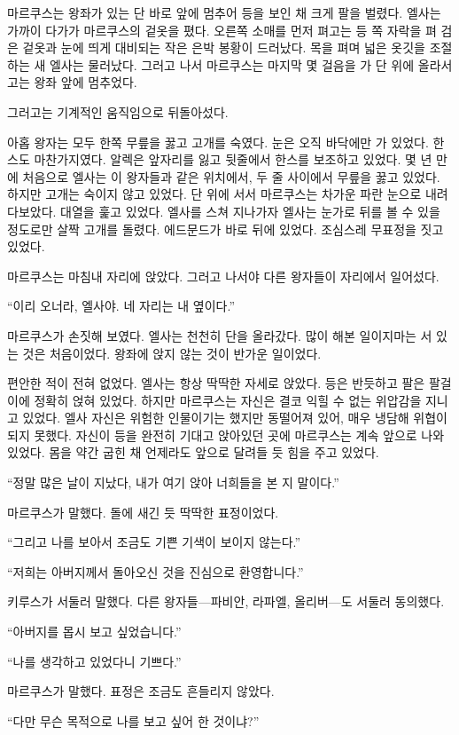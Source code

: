 마르쿠스는 왕좌가 있는 단 바로 앞에 멈추어 등을 보인 채 크게 팔을 벌렸다. 엘사는 가까이 다가가 마르쿠스의 겉옷을 폈다. 오른쪽 소매를 먼저 펴고는 등 쪽 자락을 펴 검은 겉옷과 눈에 띄게 대비되는 작은 은박 봉황이 드러났다. 목을 펴며 넓은 옷깃을 조절하는 새 엘사는 물러났다. 그러고 나서 마르쿠스는 마지막 몇 걸음을 가 단 위에 올라서고는 왕좌 앞에 멈추었다.

그러고는 기계적인 움직임으로 뒤돌아섰다.

아홉 왕자는 모두 한쪽 무릎을 꿇고 고개를 숙였다. 눈은 오직 바닥에만 가 있었다. 한스도 마찬가지였다. 알렉은 앞자리를 잃고 뒷줄에서 한스를 보조하고 있었다. 몇 년 만에 처음으로 엘사는 이 왕자들과 같은 위치에서, 두 줄 사이에서 무릎을 꿇고 있었다. 하지만 고개는 숙이지 않고 있었다. 단 위에 서서 마르쿠스는 차가운 파란 눈으로 내려다보았다. 대열을 훑고 있었다. 엘사를 스쳐 지나가자 엘사는 눈가로 뒤를 볼 수 있을 정도로만 살짝 고개를 돌렸다. 에드문드가 바로 뒤에 있었다. 조심스레 무표정을 짓고 있었다.

마르쿠스는 마침내 자리에 앉았다. 그러고 나서야 다른 왕자들이 자리에서 일어섰다.

``이리 오너라, 엘사야. 네 자리는 내 옆이다.''

마르쿠스가 손짓해 보였다. 엘사는 천천히 단을 올라갔다. 많이 해본 일이지마는 서 있는 것은 처음이었다. 왕좌에 앉지 않는 것이 반가운 일이었다.

편안한 적이 전혀 없었다. 엘사는 항상 딱딱한 자세로 앉았다. 등은 반듯하고 팔은 팔걸이에 정확히 얹혀 있었다. 하지만 마르쿠스는 자신은 결코 익힐 수 없는 위압감을 지니고 있었다. 엘사 자신은 위험한 인물이기는 했지만 동떨어져 있어, 매우 냉담해 위협이 되지 못했다. 자신이 등을 완전히 기대고 앉아있던 곳에 마르쿠스는 계속 앞으로 나와 있었다. 몸을 약간 굽힌 채 언제라도 앞으로 달려들 듯 힘을 주고 있었다.

``정말 많은 날이 지났다, 내가 여기 앉아 너희들을 본 지 말이다.''

마르쿠스가 말했다. 돌에 새긴 듯 딱딱한 표정이었다.

``그리고 나를 보아서 조금도 기쁜 기색이 보이지 않는다.''

``저희는 아버지께서 돌아오신 것을 진심으로 환영합니다.''

키루스가 서둘러 말했다. 다른 왕자들—파비안, 라파엘, 올리버—도 서둘러 동의했다.

``아버지를 몹시 보고 싶었습니다.''

``나를 생각하고 있었다니 기쁘다.''

마르쿠스가 말했다. 표정은 조금도 흔들리지 않았다.

``다만 무슨 목적으로 나를 보고 싶어 한 것이냐?''

